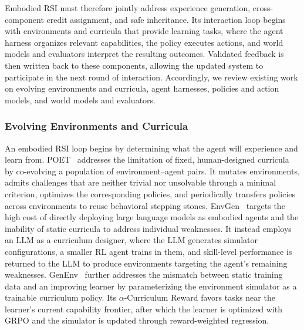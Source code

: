 Embodied RSI must therefore jointly address experience generation, cross-component credit assignment, and safe inheritance. Its interaction loop begins with environments and curricula that provide learning tasks, where the agent harness organizes relevant capabilities, the policy executes actions, and world models and evaluators interpret the resulting outcomes. Validated feedback is then written back to these components, allowing the updated system to participate in the next round of interaction. Accordingly, we review existing work on evolving environments and curricula, agent harnesses, policies and action models, and world models and evaluators.



\subsubsection{Evolving Environments and Curricula}

An embodied RSI loop begins by determining what the agent will experience and learn from. POET~\cite{wang2019poet} addresses the limitation of fixed, human-designed curricula by co-evolving a population of environment--agent pairs. It mutates environments, admits challenges that are neither trivial nor unsolvable through a minimal criterion, optimizes the corresponding policies, and periodically transfers policies across environments to reuse behavioral stepping stones. EnvGen~\cite{zala2024envgen} targets the high cost of directly deploying large language models as embodied agents and the inability of static curricula to address individual weaknesses. It instead employs an LLM as a curriculum designer, where the LLM generates simulator configurations, a smaller RL agent trains in them, and skill-level performance is returned to the LLM to produce environments targeting the agent's remaining weaknesses. 
GenEnv~\cite{guo2025genenv} further addresses the mismatch between static training data and an improving learner by parameterizing the environment simulator as a trainable curriculum policy. Its $\alpha$-Curriculum Reward favors tasks near the learner's current capability frontier, after which the learner is optimized with GRPO and the simulator is updated through reward-weighted regression.

